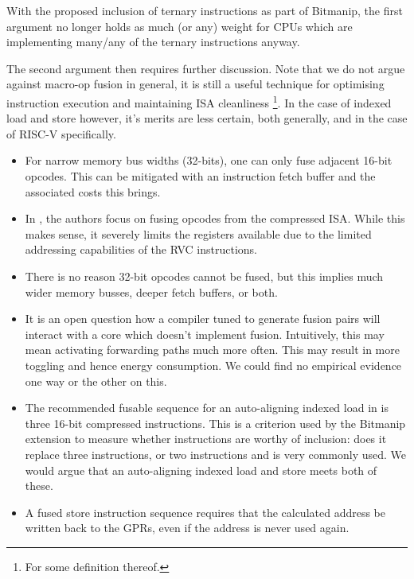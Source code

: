 With the proposed inclusion of ternary instructions as part of Bitmanip, the
first argument no longer holds as much (or any) weight for CPUs which are
implementing many/any of the ternary instructions anyway.

The second argument then requires further discussion.
Note that we do not argue against macro-op fusion in general, it
is still a useful technique for optimising instruction execution
and maintaining ISA cleanliness \footnote{For some definition thereof.}.
In the case of indexed load and store however, it's merits are
less certain, both generally, and in the case of RISC-V specifically.

\begin{itemize}
\item For narrow memory bus widths (32-bits), one can only
    fuse adjacent 16-bit opcodes. This can be mitigated with an
    instruction fetch buffer and the associated costs this brings.

\item In \cite{CDPA:16}, the authors focus on fusing opcodes from the
    compressed ISA. While this makes sense, it severely limits the
    registers available due to the limited addressing capabilities of
    the RVC instructions.

\item There is no reason 32-bit opcodes cannot be fused, but this
    implies much wider memory busses, deeper fetch buffers, or both.

\item It is an open question how a compiler tuned to generate
    fusion pairs will interact with a core which doesn't implement
    fusion. Intuitively, this may mean activating forwarding paths
    much more often. This may result in more toggling and hence
    energy consumption. We could find no empirical evidence one way
    or the other on this.

\item The recommended fusable sequence for an auto-aligning indexed load in
    \cite[Section VI.A]{CDPA:16} is three 16-bit compressed instructions.
    This is a criterion used by the Bitmanip extension to measure whether
    instructions are worthy of inclusion: does it replace three
    instructions, or two instructions and is very commonly used.
    We would argue that an auto-aligning indexed load and store
    meets both of these.

\item A fused store instruction sequence requires that the calculated
    address be written back to the GPRs, even if the address is never
    used again.


\end{itemize}
